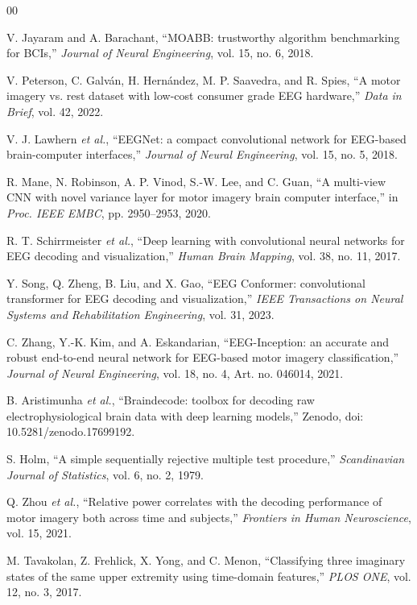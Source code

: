 \documentclass[conference]{IEEEtran}
\begin{document}
\begin{thebibliography}{00}

V. Jayaram and A. Barachant, ``MOABB: trustworthy algorithm benchmarking for BCIs,''
\emph{Journal of Neural Engineering}, vol. 15, no. 6, 2018.

V. Peterson, C. Galv{\'a}n, H. Hern{\'a}ndez, M. P. Saavedra, and R. Spies,
``A motor imagery vs. rest dataset with low-cost consumer grade EEG hardware,''
\emph{Data in Brief}, vol. 42, 2022.

V. J. Lawhern \emph{et al.}, ``EEGNet: a compact convolutional network for EEG-based
brain-computer interfaces,'' \emph{Journal of Neural Engineering}, vol. 15, no. 5, 2018.

R. Mane, N. Robinson, A. P. Vinod, S.-W. Lee, and C. Guan,
``A multi-view CNN with novel variance layer for motor imagery brain computer interface,''
in \emph{Proc. IEEE EMBC}, pp. 2950--2953, 2020.

R. T. Schirrmeister \emph{et al.}, ``Deep learning with convolutional neural networks for EEG
decoding and visualization,'' \emph{Human Brain Mapping}, vol. 38, no. 11, 2017.

Y. Song, Q. Zheng, B. Liu, and X. Gao, ``EEG Conformer: convolutional transformer for EEG decoding
and visualization,'' \emph{IEEE Transactions on Neural Systems and Rehabilitation Engineering},
vol. 31, 2023.

C. Zhang, Y.-K. Kim, and A. Eskandarian, ``EEG-Inception: an accurate and robust end-to-end
neural network for EEG-based motor imagery classification,'' \emph{Journal of Neural Engineering},
vol. 18, no. 4, Art. no. 046014, 2021.

B. Aristimunha \emph{et al.}, ``Braindecode: toolbox for decoding raw electrophysiological brain
data with deep learning models,'' Zenodo, doi: 10.5281/zenodo.17699192.

S. Holm, ``A simple sequentially rejective multiple test procedure,''
\emph{Scandinavian Journal of Statistics}, vol. 6, no. 2, 1979.

Q. Zhou \emph{et al.}, ``Relative power correlates with the decoding performance of motor imagery
both across time and subjects,'' \emph{Frontiers in Human Neuroscience}, vol. 15, 2021.

M. Tavakolan, Z. Frehlick, X. Yong, and C. Menon, ``Classifying three imaginary states of the same
upper extremity using time-domain features,'' \emph{PLOS ONE}, vol. 12, no. 3, 2017.

\end{thebibliography}
\end{document}
